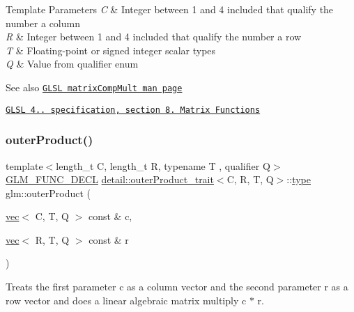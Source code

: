 \begin{DoxyTemplParams}{Template Parameters}
{\em C} & Integer between 1 and 4 included that qualify the number a column \\
\hline
{\em R} & Integer between 1 and 4 included that qualify the number a row \\
\hline
{\em T} & Floating-\/point or signed integer scalar types \\
\hline
{\em Q} & Value from qualifier enum\\
\hline
\end{DoxyTemplParams}
\begin{DoxySeeAlso}{See also}
\href{http://www.opengl.org/sdk/docs/manglsl/xhtml/matrixCompMult.xml}{\tt G\+L\+SL matrix\+Comp\+Mult man page} 

\href{http://www.opengl.org/registry/doc/GLSLangSpec.4.20.8.pdf}{\tt G\+L\+SL 4.. specification, section 8. Matrix Functions} 
\end{DoxySeeAlso}
\mbox{\label{group__core__func__matrix_gac29fb7bae75a8e4c1b74cbbf85520e50}} 
\subsubsection{\texorpdfstring{outer\+Product()}{outerProduct()}}
{\footnotesize\ttfamily template$<$length\+\_\+t C, length\+\_\+t R, typename T , qualifier Q$>$ \\
\hyperlink{setup_8hpp_ab2d052de21a70539923e9bcbf6e83a51}{G\+L\+M\+\_\+\+F\+U\+N\+C\+\_\+\+D\+E\+CL} \hyperlink{structglm_1_1detail_1_1outer_product__trait}{detail\+::outer\+Product\+\_\+trait}$<$C, R, T, Q$>$\+::\hyperlink{structglm_1_1type}{type} glm\+::outer\+Product (\begin{DoxyParamCaption}\item[{\hyperlink{structglm_1_1vec}{vec}$<$ C, T, Q $>$ const \&}]{c,  }\item[{\hyperlink{structglm_1_1vec}{vec}$<$ R, T, Q $>$ const \&}]{r }\end{DoxyParamCaption})}

Treats the first parameter c as a column vector and the second parameter r as a row vector and does a linear algebraic matrix multiply c $\ast$ r.


